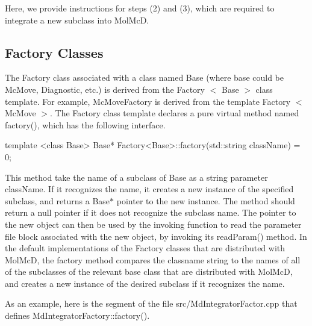 Here, we provide instructions for steps (2) and (3), which are required to integrate a new subclass into Mol\+McD.\hypertarget{extension_page_factory_custom_sec}{}\subsection{Factory Classes}\label{extension_page_factory_custom_sec}
The Factory class associated with a class named Base (where base could be Mc\+Move, Diagnostic, etc.) is derived from the Factory $<$ Base $>$ class template. For example, Mc\+Move\+Factory is derived from the template Factory $<$ Mc\+Move $>$. The Factory class template declares a pure virtual method named factory(), which has the following interface. 
\begin{DoxyCode}
\textcolor{keyword}{template} <\textcolor{keyword}{class} Base>
Base* Factory<Base>::factory(std::string className) = 0;
\end{DoxyCode}
 This method take the name of a subclass of Base as a string parameter class\+Name. If it recognizes the name, it creates a new instance of the specified subclass, and returns a Base$\ast$ pointer to the new instance. The method should return a null pointer if it does not recognize the subclass name. The pointer to the new object can then be used by the invoking function to read the parameter file block associated with the new object, by invoking its read\+Param() method. In the default implementations of the Factory classes that are distributed with Mol\+McD, the factory method compares the classname string to the names of all of the subclasses of the relevant base class that are distributed with Mol\+McD, and creates a new instance of the desired subclass if it recognizes the name.

As an example, here is the segment of the file src/\+Md\+Integrator\+Factor.\+cpp that defines Md\+Integrator\+Factory\+::factory().


